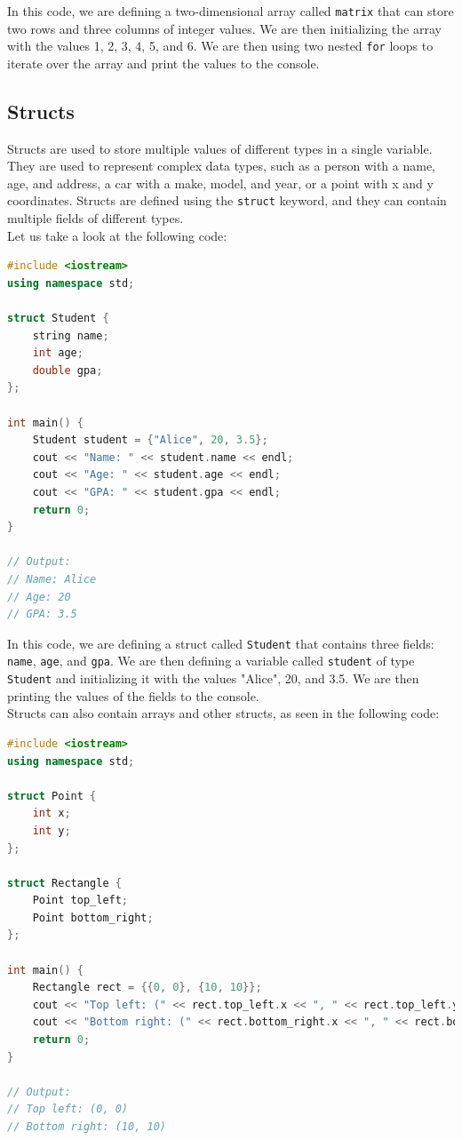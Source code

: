 In this code, we are defining a two-dimensional array called \texttt{matrix} that can store two rows and three columns of integer
values. We are then initializing the array with the values 1, 2, 3, 4, 5, and 6. We are then using two nested \texttt{for} loops
to iterate over the array and print the values to the console.\\

\subsection{Structs}

Structs are used to store multiple values of different types in a single variable. They are used to represent complex data types,
such as a person with a name, age, and address, a car with a make, model, and year, or a point with x and y coordinates. Structs
are defined using the \texttt{struct} keyword, and they can contain multiple fields of different types.\\

Let us take a look at the following code:

\begin{lstlisting}[language=C++]
#include <iostream>
using namespace std;

struct Student {
    string name;
    int age;
    double gpa;
};

int main() {
    Student student = {"Alice", 20, 3.5};
    cout << "Name: " << student.name << endl;
    cout << "Age: " << student.age << endl;
    cout << "GPA: " << student.gpa << endl;
    return 0;
}

// Output:
// Name: Alice
// Age: 20
// GPA: 3.5
\end{lstlisting}

In this code, we are defining a struct called \texttt{Student} that contains three fields: \texttt{name}, \texttt{age}, and
\texttt{gpa}. We are then defining a variable called \texttt{student} of type \texttt{Student} and initializing it with the
values "Alice", 20, and 3.5. We are then printing the values of the fields to the console.\\

Structs can also contain arrays and other structs, as seen in the following code:

\begin{lstlisting}[language=C++]
#include <iostream>
using namespace std;

struct Point {
    int x;
    int y;
};

struct Rectangle {
    Point top_left;
    Point bottom_right;
};

int main() {
    Rectangle rect = {{0, 0}, {10, 10}};
    cout << "Top left: (" << rect.top_left.x << ", " << rect.top_left.y << ")" << endl;
    cout << "Bottom right: (" << rect.bottom_right.x << ", " << rect.bottom_right.y << ")" << endl;
    return 0;
}

// Output:
// Top left: (0, 0)
// Bottom right: (10, 10)
\end{lstlisting}


